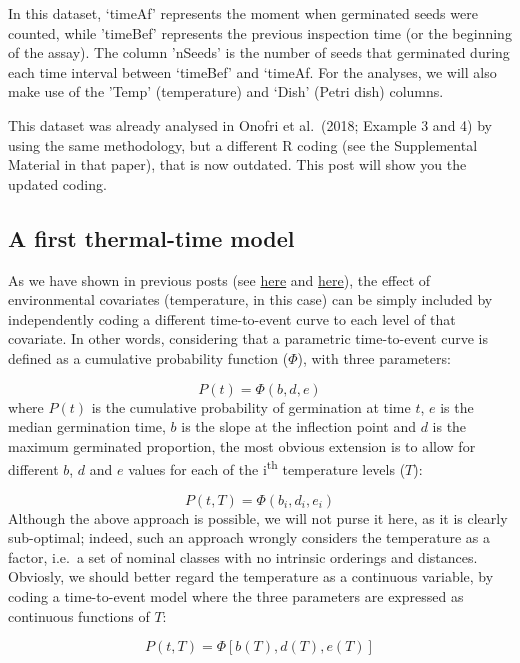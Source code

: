 \documentclass[
]{book}
\begin{document}
In this dataset, `timeAf' represents the moment when germinated seeds were counted, while 'timeBef' represents the previous inspection time (or the beginning of the assay). The column 'nSeeds' is the number of seeds that germinated during each time interval between `timeBef' and `timeAf. For the analyses, we will also make use of the 'Temp' (temperature) and `Dish' (Petri dish) columns.

This dataset was already analysed in Onofri et al.~(2018; Example 3 and 4) by using the same methodology, but a different R coding (see the Supplemental Material in that paper), that is now outdated. This post will show you the updated coding.

\hypertarget{a-first-thermal-time-model}{%
\subsection{A first thermal-time model}\label{a-first-thermal-time-model}}

As we have shown in previous posts (see \href{https://www.statforbiology.com/2022/stat_drcte_6-ht1step/}{here} and \href{https://www.statforbiology.com/2023/stat_drcte_10-examplehtte/}{here}), the effect of environmental covariates (temperature, in this case) can be simply included by independently coding a different time-to-event curve to each level of that covariate. In other words, considering that a parametric time-to-event curve is defined as a cumulative probability function (\(\Phi\)), with three parameters:

\[P(t) = \Phi \left( b, d, e \right)\]
where \(P(t)\) is the cumulative probability of germination at time \(t\), \(e\) is the median germination time, \(b\) is the slope at the inflection point and \(d\) is the maximum germinated proportion, the most obvious extension is to allow for different \(b\), \(d\) and \(e\) values for each of the i\textsuperscript{th} temperature levels (\(T\)):

\[P(t, T) = \Phi \left( b_i, d_i, e_i \right)\]
Although the above approach is possible, we will not purse it here, as it is clearly sub-optimal; indeed, such an approach wrongly considers the temperature as a factor, i.e.~a set of nominal classes with no intrinsic orderings and distances. Obviosly, we should better regard the temperature as a continuous variable, by coding a time-to-event model where the three parameters are expressed as continuous functions of \(T\):

\[P(t, T) = \Phi \left[ b(T), d(T), e(T) \right]\]
\end{document}
